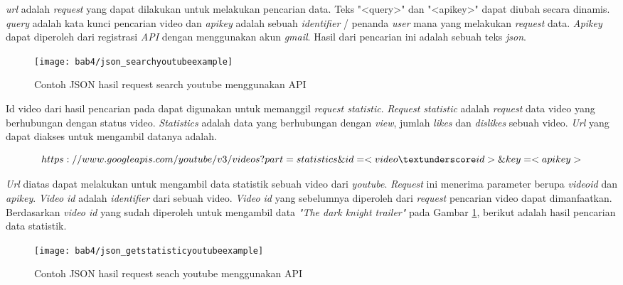 \textit{url} adalah \textit{request} yang dapat dilakukan untuk melakukan pencarian data. Teks "<query>" dan "<apikey>" dapat diubah secara dinamis. \textit{query} adalah kata kunci pencarian video dan \textit{apikey} adalah sebuah \textit{identifier} / penanda \textit{user} mana yang melakukan \textit{request} data. \textit{Apikey} dapat diperoleh dari registrasi \textit{API} dengan menggunakan akun \textit{gmail}. Hasil dari pencarian ini adalah sebuah teks \textit{json}.



\begin{figure}[H]
	\centering  
	\texttt{[image: bab4/json\_searchyoutubeexample]}   
	\caption{Contoh JSON hasil request search youtube menggunakan API }
	\label{fig:json_searchyoutubeexample} 
\end{figure} 


Id video dari hasil pencarian pada dapat digunakan untuk memanggil \textit{request statistic}. \textit{Request statistic} adalah \textit{request} data video yang berhubungan dengan status video. \textit{Statistics} adalah data yang berhubungan dengan \textit{view}, jumlah \textit{likes} dan \textit{dislikes} sebuah video. \textit{Url} yang dapat diakses untuk mengambil datanya adalah. 



\begin{displaymath}
https://www.googleapis.com/youtube/v3/videos?part=statistics\& id= <video\textunderscore id>\& key=<apikey>
\end{displaymath}

\textit{Url} diatas dapat melakukan untuk mengambil data statistik sebuah video dari \textit{youtube}. \textit{Request} ini menerima parameter berupa \textit{video\textunderscore id} dan \textit{apikey}. \textit{Video id} adalah \textit{identifier} dari sebuah video. \textit{Video id}  yang sebelumnya diperoleh dari \textit{request} pencarian video dapat dimanfaatkan. Berdasarkan \textit{video id} yang sudah diperoleh untuk mengambil data \textit{"The dark knight trailer"} pada Gambar \ref{fig:json_searchyoutubeexample}, berikut adalah hasil pencarian data statistik. 

\begin{figure}[H]
	\centering  
	\texttt{[image: bab4/json\_getstatisticyoutubeexample]}   
	\caption{Contoh JSON hasil request seach youtube menggunakan API }
	\label{fig:json_getstatisticyoutubeexample} 
\end{figure} 

